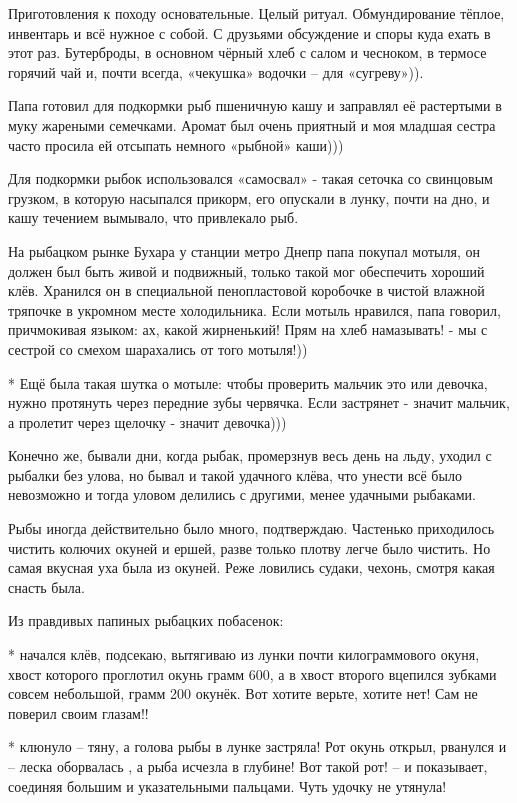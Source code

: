 
Приготовления к походу основательные. Целый ритуал. Обмундирование тёплое,
инвентарь и всё нужное с собой. С друзьями обсуждение и споры куда ехать в этот
раз. Бутерброды, в основном чёрный хлеб с салом и чесноком, в термосе горячий
чай и, почти всегда, «чекушка» водочки – для «сугреву»)).  

Папа готовил для подкормки рыб пшеничную кашу и заправлял её растертыми в муку
жареными семечками. Аромат был очень приятный и моя младшая сестра часто
просила ей отсыпать немного «рыбной» каши))) 

Для подкормки рыбок использовался «самосвал» - такая сеточка со свинцовым
грузком, в которую насыпался прикорм, его опускали в лунку, почти на дно, и
кашу течением  вымывало, что привлекало рыб.

На рыбацком рынке Бухара у станции метро Днепр папа покупал мотыля, он должен
был быть живой и подвижный, только такой мог обеспечить хороший клёв. Хранился
он в специальной пенопластовой коробочке в чистой влажной тряпочке в укромном
месте холодильника. Если мотыль нравился, папа говорил, причмокивая языком: ах,
какой жирненький! Прям на хлеб намазывать! - мы с сестрой со смехом шарахались
от того мотыля!)) 

* Ещё была такая шутка о мотыле: чтобы проверить мальчик это или девочка, нужно
протянуть через передние зубы червячка. Если застрянет - значит мальчик, а
пролетит через щелочку - значит девочка))) 

Конечно же, бывали дни, когда рыбак, промерзнув весь день на льду, уходил с
рыбалки без улова, но бывал и такой удачного клёва, что  унести  всё было
невозможно и тогда уловом делились с другими, менее удачными рыбаками. 

Рыбы иногда действительно было много, подтверждаю. Частенько приходилось
чистить колючих окуней и ершей, разве только плотву легче было чистить. Но
самая вкусная уха была из окуней. Реже ловились судаки, чехонь, смотря какая
снасть была.

Из правдивых папиных рыбацких побасенок:

* начался клёв, подсекаю, вытягиваю из лунки почти килограммового окуня, хвост
которого проглотил окунь грамм 600, а в хвост второго вцепился зубками совсем
небольшой, грамм 200 окунёк. Вот хотите верьте, хотите нет! Сам не поверил
своим глазам!!

* клюнуло – тяну, а голова рыбы в лунке застряла! Рот окунь открыл, рванулся и
– леска оборвалась , а рыба исчезла в глубине! Вот такой рот! – и показывает,
соединяя большим и указательными пальцами. Чуть удочку не утянула!

